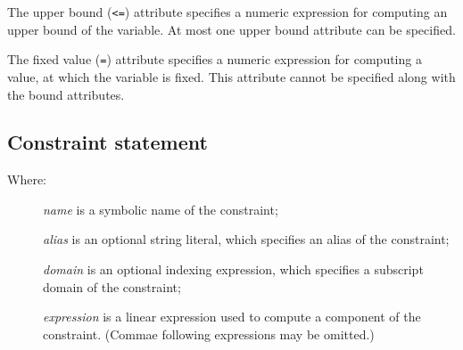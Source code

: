 \documentclass[10pt]{article}
\begin{document}
The upper bound ({\tt<=}) attribute specifies a numeric expression for
computing an upper bound of the variable. At most one upper bound
attribute can be specified.

The fixed value ({\tt=}) attribute specifies a numeric expression for
computing a value, at which the variable is fixed. This attribute
cannot be specified along with the bound attributes.

\subsection{Constraint statement}

\medskip


\setlength{\leftmargini}{60pt}

\begin{description}
\item[{\rm Where:}\hspace*{23pt}] {\it name} is a symbolic name of the
constraint;
\item[\hspace*{54pt}] {\it alias} is an optional string literal, which
specifies an alias of the constraint;
\item[\hspace*{54pt}] {\it domain} is an optional indexing expression,
which specifies a subscript domain of the constraint;
\item[\hspace*{54pt}] {\it expression} is a linear expression used to
compute a component of the constraint. (Commae following expressions
may be omitted.)
\end{description}
\end{document}
